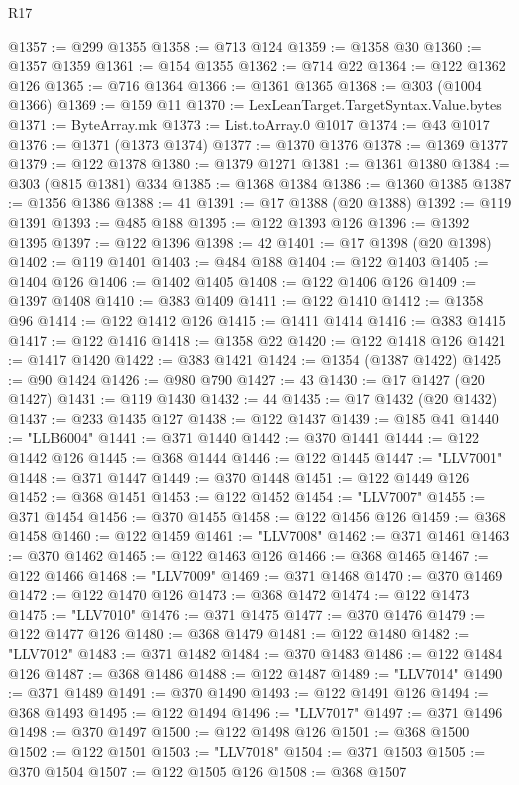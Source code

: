 \begin{lexlean}{R17}
\begin{coremodule}
{{{{{{{{{{{{{{{{{{{{{{{{{{{{{{{{{{{{{{{{{{{{{{{{{{{{{{{{{{{{{{{{{{{{{{{{{{{{{{{{{{{{{{{{{{{{{{{{{{{{{{{{{{{@1357 := @299 @1355
@1358 := @713 @124
@1359 := @1358 @30
@1360 := @1357 @1359
@1361 := @154 @1355
@1362 := @714 @22
@1364 := @122 @1362 @126
@1365 := @716 @1364
@1366 := @1361 @1365
@1368 := @303 (@1004 @1366)
@1369 := @159 @11
@1370 := LexLeanTarget.TargetSyntax.Value.bytes
@1371 := ByteArray.mk
@1373 := List.toArray.{0} @1017
@1374 := @43 @1017
@1376 := @1371 (@1373 @1374)
@1377 := @1370 @1376
@1378 := @1369 @1377
@1379 := @122 @1378
@1380 := @1379 @1271
@1381 := @1361 @1380
@1384 := @303 (@815 @1381) @334
@1385 := @1368 @1384
@1386 := @1360 @1385
@1387 := @1356 @1386
@1388 := 41
@1391 := @17 @1388 (@20 @1388)
@1392 := @119 @1391
@1393 := @485 @188
@1395 := @122 @1393 @126
@1396 := @1392 @1395
@1397 := @122 @1396
@1398 := 42
@1401 := @17 @1398 (@20 @1398)
@1402 := @119 @1401
@1403 := @484 @188
@1404 := @122 @1403
@1405 := @1404 @126
@1406 := @1402 @1405
@1408 := @122 @1406 @126
@1409 := @1397 @1408
@1410 := @383 @1409
@1411 := @122 @1410
@1412 := @1358 @96
@1414 := @122 @1412 @126
@1415 := @1411 @1414
@1416 := @383 @1415
@1417 := @122 @1416
@1418 := @1358 @22
@1420 := @122 @1418 @126
@1421 := @1417 @1420
@1422 := @383 @1421
@1424 := @1354 (@1387 @1422)
@1425 := @90 @1424
@1426 := @980 @790
@1427 := 43
@1430 := @17 @1427 (@20 @1427)
@1431 := @119 @1430
@1432 := 44
@1435 := @17 @1432 (@20 @1432)
@1437 := @233 @1435 @127
@1438 := @122 @1437
@1439 := @185 @41
@1440 := "LLB6004"
@1441 := @371 @1440
@1442 := @370 @1441
@1444 := @122 @1442 @126
@1445 := @368 @1444
@1446 := @122 @1445
@1447 := "LLV7001"
@1448 := @371 @1447
@1449 := @370 @1448
@1451 := @122 @1449 @126
@1452 := @368 @1451
@1453 := @122 @1452
@1454 := "LLV7007"
@1455 := @371 @1454
@1456 := @370 @1455
@1458 := @122 @1456 @126
@1459 := @368 @1458
@1460 := @122 @1459
@1461 := "LLV7008"
@1462 := @371 @1461
@1463 := @370 @1462
@1465 := @122 @1463 @126
@1466 := @368 @1465
@1467 := @122 @1466
@1468 := "LLV7009"
@1469 := @371 @1468
@1470 := @370 @1469
@1472 := @122 @1470 @126
@1473 := @368 @1472
@1474 := @122 @1473
@1475 := "LLV7010"
@1476 := @371 @1475
@1477 := @370 @1476
@1479 := @122 @1477 @126
@1480 := @368 @1479
@1481 := @122 @1480
@1482 := "LLV7012"
@1483 := @371 @1482
@1484 := @370 @1483
@1486 := @122 @1484 @126
@1487 := @368 @1486
@1488 := @122 @1487
@1489 := "LLV7014"
@1490 := @371 @1489
@1491 := @370 @1490
@1493 := @122 @1491 @126
@1494 := @368 @1493
@1495 := @122 @1494
@1496 := "LLV7017"
@1497 := @371 @1496
@1498 := @370 @1497
@1500 := @122 @1498 @126
@1501 := @368 @1500
@1502 := @122 @1501
@1503 := "LLV7018"
@1504 := @371 @1503
@1505 := @370 @1504
@1507 := @122 @1505 @126
@1508 := @368 @1507
}}}}}}}}}}}}}}}}}}}}}}}}}}}}}}}}}}}}}}}}}}}}}}}}}}}}}}}}}}}}}}}}}}}}}}}}}}}}}}}}}}}}}}}}}}}}}}}}}}}}}}}}}}}
\end{coremodule}
\end{lexlean}
